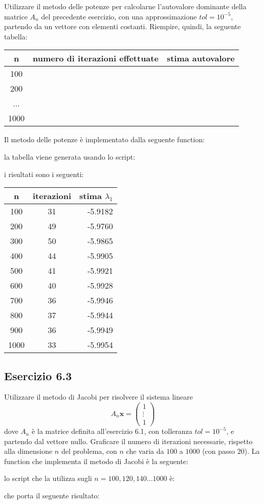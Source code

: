 Utilizzare il metodo delle potenze per calcolarne l’autovalore dominante della matrice $A_n$ del precedente esercizio, con una approssimazione $tol = 10^{-5}$, partendo da un vettore con elementi costanti. Riempire, quindi, la seguente
tabella:
\begin{tabular}{|c|c|c|}
\hline
n & numero di iterazioni effettuate & stima autovalore\\
\hline
100 & & \\
200 & & \\
... & & \\
1000 & & \\
\hline
\end{tabular}
\PP
Il metodo delle potenze è implementato dalla seguente function:

la tabella viene generata usando lo script:

i risultati sono i seguenti:
\begin{tabular}{|c|c|r|}
	\hline
	n & iterazioni & stima $\lambda_1 $\\
	\hline
     	100  &  31  &  -5.9182  \\
     	200  &  49  &  -5.9760  \\
     	300  &  50  &  -5.9865  \\
     	400  &  44  &  -5.9905  \\
     	500  &  41  &  -5.9921  \\
     	600  &  40  &  -5.9928  \\
     	700  &  36  &  -5.9946  \\
     	800  &  37  &  -5.9944  \\
     	900  &  36  &  -5.9949  \\
    	1000  &  33  &  -5.9954  \\
    	\hline
\end{tabular}



	\subsection{Esercizio 6.3}

Utilizzare il metodo di Jacobi per risolvere il sistema lineare
\begin{equation*}
	A_n \mathbf{x} = \begin{pmatrix} 1 \\ \vdots \\ 1 \end{pmatrix}
\end{equation*}
dove $A_n$ è la matrice definita all'esercizio 6.1, con tolleranza $tol = 10^{-5}$, e partendo dal vettore nullo. Graficare il numero di iterazioni necessarie, rispetto alla dimensione $n$ del problema, con $n$ che varia da $100$ a $1000$ (con passo $20$).
\PP
La function che implementa il metodo di Jacobi è la seguente:

lo script che la utilizza sugli $n = 100, 120, 140 ... 1000$ è:

che porta il seguente risultato:



